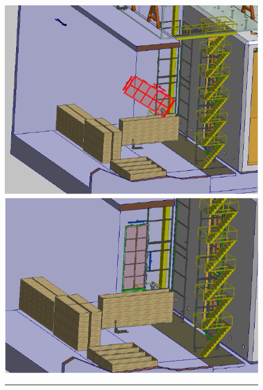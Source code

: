 \begin{figure}[!htb]
\begin{center}
\begin{minipage}[c]{0.32\textwidth}
\end{minipage}
\begin{minipage}[c]{0.32\textwidth}
\includegraphics[width=\textwidth]{far-detector-single-phase/figures/APA-2.pdf}
\end{minipage}
\begin{minipage}[c]{0.32\textwidth}
\includegraphics[width=\textwidth]{far-detector-single-phase/figures/APA-3.pdf}
\end{minipage}
%
\vspace{5mm}
\hrule
\vspace{5mm}
%
\begin{minipage}[c]{0.32\textwidth}

\end{minipage}
\end{center}
\end{figure}
